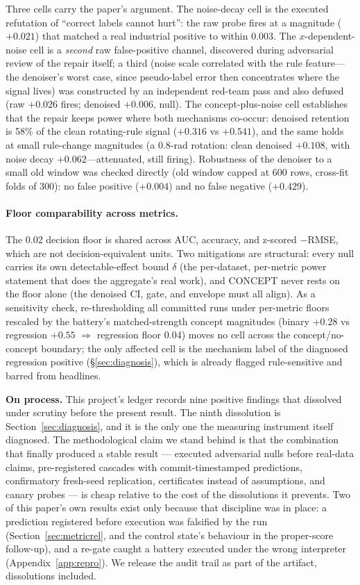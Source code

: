 \documentclass[10pt]{article} %
\begin{document}
Three cells carry the paper's argument. The noise-decay cell is the executed refutation of
``correct labels cannot hurt'': the raw probe fires at a magnitude ($+0.021$) that matched a real
industrial positive to within 0.003. The $x$-dependent-noise cell is a \emph{second} raw false-positive
channel, discovered during adversarial review of the repair itself; a third (noise scale
correlated with the rule feature---the denoiser's worst case, since pseudo-label error then
concentrates where the signal lives) was constructed by an independent red-team pass and also
defused (raw $+0.026$ fires; denoised $+0.006$, null). The concept-plus-noise cell establishes that
the repair keeps power where both mechanisms co-occur: denoised retention is 58\% of the clean
rotating-rule signal ($+0.316$ vs $+0.541$), and the same holds at small rule-change magnitudes
(a 0.8-rad rotation: clean denoised $+0.108$, with noise decay $+0.062$---attenuated, still firing).
Robustness of the denoiser to a small old window was checked directly (old window capped at 600
rows, cross-fit folds of 300): no false positive ($+0.004$) and no false negative ($+0.429$).

\paragraph{Floor comparability across metrics.} The 0.02 decision floor is shared across AUC, accuracy,
and z-scored $-$RMSE, which are not decision-equivalent units. Two mitigations are structural:
every null carries its own detectable-effect bound $\delta$ (the per-dataset, per-metric power
statement that does the aggregate's real work), and CONCEPT never rests on the floor alone (the
denoised CI, gate, and envelope must all align). As a sensitivity check, re-thresholding all
committed runs under per-metric floors rescaled by the battery's matched-strength concept
magnitudes (binary $+0.28$ vs regression $+0.55$ $\Rightarrow$ regression floor 0.04) moves no cell across the
concept/no-concept boundary; the only affected cell is the mechanism label of the diagnosed
regression positive (\S\ref{sec:diagnosis}), which is already flagged rule-sensitive and barred from headlines.

\textbf{On process.} This project's ledger records nine positive findings that dissolved under scrutiny
before the present result. The ninth dissolution is Section~\ref{sec:diagnosis}, and it is the only one the measuring
instrument itself diagnosed. The methodological claim we stand behind is that the combination that
finally produced a stable result --- executed adversarial nulls before real-data claims,
pre-registered cascades with commit-timestamped predictions, confirmatory fresh-seed replication,
certificates instead of assumptions, and canary probes --- is cheap relative to the cost of the
dissolutions it prevents. Two of this paper's own results exist only because that discipline was in
place: a prediction registered before execution was falsified by the run (Section~\ref{sec:metricrel}, and the control
state's behaviour in the proper-score follow-up), and a re-gate caught a battery executed under the
wrong interpreter (Appendix~\ref{app:repro}). We release the audit trail as part of the artifact, dissolutions included.
\end{document}
